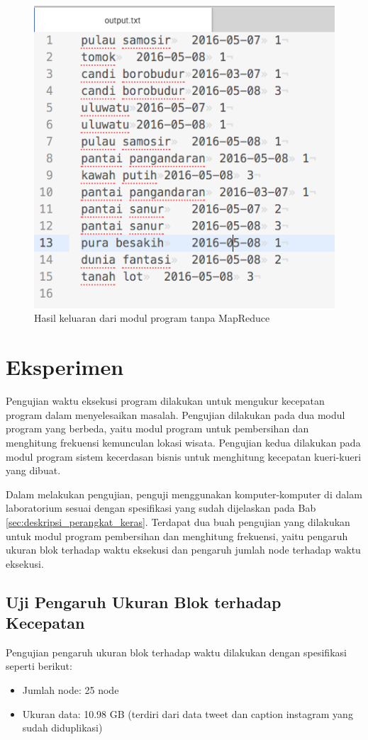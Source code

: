 \begin{figure}[H]
	\centering
	\includegraphics[scale=0.5]{Gambar/counter-single-output.png}
	\caption[Hasil keluaran dari modul program tanpa MapReduce]{Hasil keluaran dari modul program tanpa MapReduce} 
	\label{fig:counter_single_output}
\end{figure}

\section{Eksperimen}
Pengujian waktu eksekusi program dilakukan untuk mengukur kecepatan program dalam menyelesaikan masalah. Pengujian dilakukan pada dua modul program yang berbeda, yaitu modul program untuk pembersihan dan menghitung frekuensi kemunculan lokasi wisata. Pengujian kedua dilakukan pada modul program sistem kecerdasan bisnis untuk menghitung kecepatan kueri-kueri yang dibuat.

Dalam melakukan pengujian, penguji menggunakan komputer-komputer di dalam laboratorium sesuai dengan spesifikasi yang sudah dijelaskan pada Bab \ref{sec:deskripsi_perangkat_keras}. Terdapat dua buah pengujian yang dilakukan untuk modul program pembersihan dan menghitung frekuensi, yaitu pengaruh ukuran blok terhadap waktu eksekusi dan pengaruh jumlah node terhadap waktu eksekusi.

\subsection{Uji Pengaruh Ukuran Blok terhadap Kecepatan}
Pengujian pengaruh ukuran blok terhadap waktu dilakukan dengan spesifikasi seperti berikut: 
\begin{itemize}
	\item Jumlah node: 25 node
	\item Ukuran data: 10.98 GB (terdiri dari data tweet dan caption instagram yang sudah diduplikasi)
\end{itemize}

